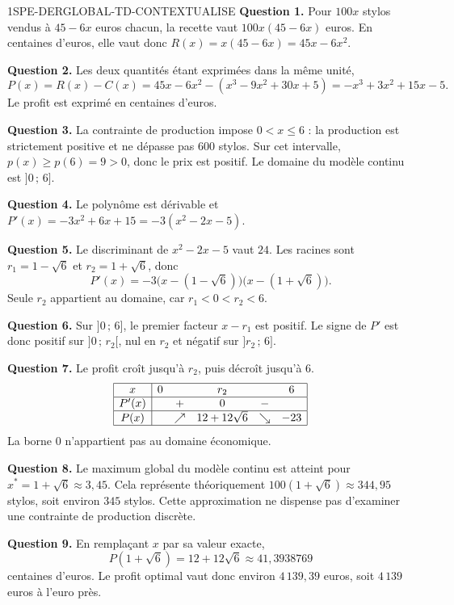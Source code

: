 \ifnxVersionProfesseur
\begin{corrige}{1SPE-DERGLOBAL-TD-CONTEXTUALISE}
\textbf{Question 1.}
Pour $100x$ stylos vendus à $45-6x$ euros chacun, la recette vaut
$100x(45-6x)$ euros. En centaines d'euros, elle vaut donc
$R(x)=x(45-6x)=45x-6x^2$.

\textbf{Question 2.}
Les deux quantités étant exprimées dans la même unité,
\[
P(x)=R(x)-C(x)=45x-6x^2-(x^3-9x^2+30x+5)
=-x^3+3x^2+15x-5.
\]
Le profit est exprimé en centaines d'euros.

\textbf{Question 3.}
La contrainte de production impose $0<x\leqslant6$ : la production est
strictement positive et ne dépasse pas $600$ stylos. Sur cet intervalle,
$p(x)\geqslant p(6)=9>0$, donc le prix est positif. Le domaine du modèle
continu est $]0\,;\,6]$.

\textbf{Question 4.}
Le polynôme est dérivable et $P'(x)=-3x^2+6x+15=-3(x^2-2x-5)$.

\textbf{Question 5.}
Le discriminant de $x^2-2x-5$ vaut $24$. Les racines sont
$r_1=1-\sqrt6$ et $r_2=1+\sqrt6$, donc
\[
P'(x)=-3\bigl(x-(1-\sqrt6)\bigr)\bigl(x-(1+\sqrt6)\bigr).
\]
Seule $r_2$ appartient au domaine, car $r_1<0<r_2<6$.

\textbf{Question 6.}
Sur $]0\,;\,6]$, le premier facteur $x-r_1$ est positif.
Le signe de $P'$ est donc positif sur $]0\,;\,r_2[$, nul en $r_2$
et négatif sur $]r_2\,;\,6]$.

\textbf{Question 7.}
Le profit croît jusqu'à $r_2$, puis décroît jusqu'à $6$.
\[
\begin{array}{|c|ccccc|}
\hline
x & 0 & & r_2 & & 6 \\
\hline
P'(x) & & + & 0 & - & \\
\hline
P(x) & & \nearrow & 12+12\sqrt6 & \searrow & -23 \\
\hline
\end{array}
\]
La borne $0$ n'appartient pas au domaine économique.

\textbf{Question 8.}
Le maximum global du modèle continu est atteint pour
$x^*=1+\sqrt6\approx3{,}45$. Cela représente théoriquement
$100(1+\sqrt6)\approx344{,}95$ stylos, soit environ $345$ stylos.
Cette approximation ne dispense pas d'examiner une contrainte de production discrète.

\textbf{Question 9.}
En remplaçant $x$ par sa valeur exacte,
\[
P(1+\sqrt6)=12+12\sqrt6\approx41{,}3938769
\]
centaines d'euros. Le profit optimal vaut donc environ
$4\,139{,}39$ euros, soit $4\,139$ euros à l'euro près.


\end{corrige}
